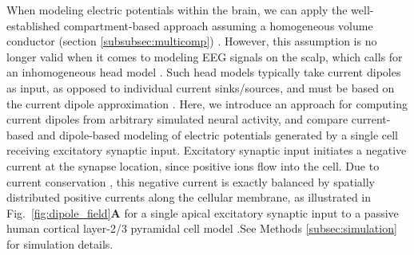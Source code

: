 \documentclass[preprint,10pt,authoryear]{elsarticle}
\newcommand{\hlb}[2][NavyBlue]{ {\sethlcolor{#1} \hl{#2}} }
\newcommand{\hlg}[2][Emerald]{ {\sethlcolor{#1} \hl{#2}} }
\newcommand{\hlp}[2][Purple]{ {\sethlcolor{#1} \hl{#2}} }
\newcommand{\snnote}[1]{\color{white}{\hlb{SN: #1 }}\color{black}}
\newcommand{\sntxt}[1]{{\color{NavyBlue}#1}}
\newcommand{\tvnnote}[1]{\color{white}{\hlg{TVN: #1 }}\color{black}}
\newcommand{\gen}[1]{\color{white}{\hlp{GTE: #1 }}\color{black}}
\begin{document}

When modeling electric potentials within the brain, we can apply the well-established compartment-based approach assuming a homogeneous volume conductor (section \ref{subsubsec:multicomp}) \citep{EINEVOLL2013REVIEW,HOLT1999}.
However, this assumption is no longer valid when it comes to modeling EEG signals on the scalp, which calls for an inhomogeneous head model \citep{Ilmoniemi2019}. Such head models typically take current dipoles as input, as opposed to individual current sinks/sources, and must be based on the current dipole approximation \citep{NUNEZ2006}. Here, we introduce an approach for computing current dipoles from arbitrary simulated neural activity, and compare current-based and dipole-based modeling of electric potentials generated by a single cell receiving excitatory synaptic input.
Excitatory synaptic input initiates a negative current at the synapse location, since positive ions flow into the cell. Due to current conservation \citep{Koch1999}, this negative current is exactly balanced by spatially distributed positive currents along the cellular membrane, as illustrated in Fig.~\ref{fig:dipole_field}\textbf{A} for a single apical excitatory synaptic input to a passive human cortical layer-2/3 pyramidal cell model \citep{EYAL2016}.See Methods \ref{subsec:simulation} for simulation details.
\end{document}
